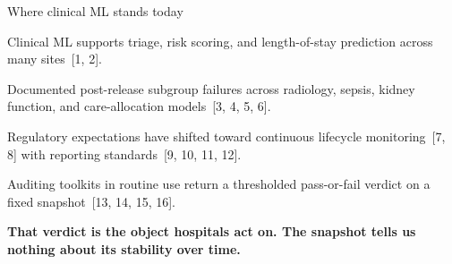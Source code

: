 \documentclass[aspectratio=169,11pt]{beamer}
\begin{document}
\begin{frame}{Where clinical ML stands today}
\small
\begin{factbox}
\enspace Clinical ML supports triage, risk scoring, and length-of-stay prediction across many sites~[1, 2].
\end{factbox}
\begin{alertbox}
\enspace Documented post-release subgroup failures across radiology, sepsis, kidney function, and care-allocation models~[3, 4, 5, 6].
\end{alertbox}
\begin{teabox}
\enspace Regulatory expectations have shifted toward continuous lifecycle monitoring~[7, 8] with reporting standards~[9, 10, 11, 12].
\end{teabox}
\begin{factbox}
\enspace Auditing toolkits in routine use return a thresholded pass-or-fail verdict on a fixed snapshot~[13, 14, 15, 16].
\end{factbox}
\vspace{2pt}
\centering\textbf{\color{ink}\large That verdict is the object hospitals act on. The snapshot tells us nothing about its stability over time.}
\end{frame}
\end{document}

